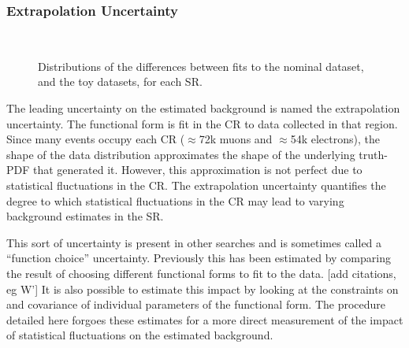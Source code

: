 \subsubsection{Extrapolation Uncertainty}
\begin{figure}[h!]
\captionsetup[subfigure]{position=b}
\centering
{} 
 \\
\caption{Distributions of the differences between fits to the nominal dataset, and the toy datasets, for each SR.}
\label{fig:ciBkgEuSyst}
\end{figure}

The leading uncertainty on the estimated background is named the extrapolation uncertainty.
The functional form is fit in the CR to data collected in that region.
Since many events occupy each CR ($\approx$72k muons and $\approx$54k electrons), the shape of the \mll data distribution approximates the shape of the underlying truth-PDF that generated it.
However, this approximation is not perfect due to statistical fluctuations in the CR.
The extrapolation uncertainty quantifies the degree to which statistical fluctuations in the CR may lead to varying background estimates in the SR.

This sort of uncertainty is present in other searches and is sometimes called a ``function choice'' uncertainty.
Previously this has been estimated by comparing the result of choosing different functional forms to fit to the data.  {\color{red} [add citations, eg W']}
It is also possible to estimate this impact by looking at the constraints on and covariance of individual parameters of the functional form.
The procedure detailed here forgoes these estimates for a more direct measurement of the impact of statistical fluctuations on the estimated background.

